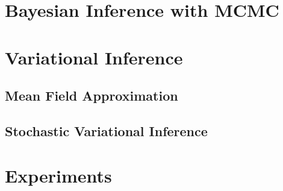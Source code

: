 \section{Bayesian Inference with MCMC}

\section{Variational Inference}

\subsection{Mean Field Approximation}

\subsection{Stochastic Variational Inference}

\section{Experiments}



